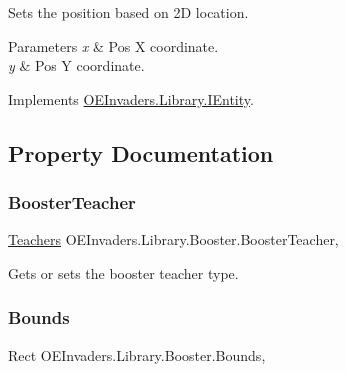 Sets the position based on 2D location. 


\begin{DoxyParams}{Parameters}
{\em x} & Pos X coordinate.\\
\hline
{\em y} & Pos Y coordinate.\\
\hline
\end{DoxyParams}


Implements \mbox{\hyperlink{interface_o_e_invaders_1_1_library_1_1_i_entity_ae2cf61539ba662a6793fef01abcad2ef}{O\+E\+Invaders.\+Library.\+I\+Entity}}.



\subsection{Property Documentation}
\mbox{\label{class_o_e_invaders_1_1_library_1_1_booster_a38b23e143b2a6769b5578991ed895cc0}} 
\subsubsection{\texorpdfstring{BoosterTeacher}{BoosterTeacher}}
{\footnotesize\ttfamily \mbox{\hyperlink{namespace_o_e_invaders_1_1_library_ad26529e6e309f95c10efa56a99f0b80e}{Teachers}} O\+E\+Invaders.\+Library.\+Booster.\+Booster\+Teacher\hspace{0.3cm}{\ttfamily [get]}, {\ttfamily [set]}}



Gets or sets the booster teacher type. 

\mbox{\label{class_o_e_invaders_1_1_library_1_1_booster_ab4caac459aabcee8eb03bb920a75a045}} 
\subsubsection{\texorpdfstring{Bounds}{Bounds}}
{\footnotesize\ttfamily Rect O\+E\+Invaders.\+Library.\+Booster.\+Bounds\hspace{0.3cm}{\ttfamily [get]}, {\ttfamily [set]}}



